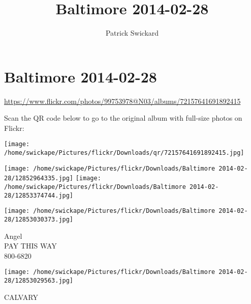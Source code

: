 \documentclass[10pt,letterpaper]{article}
\title{Baltimore 2014-02-28}
\author{Patrick Swickard}
\date{}
\begin{document}
\section*{Baltimore 2014-02-28}

\url{https://www.flickr.com/photos/99753978@N03/albums/72157641691892415}

Scan the QR code below to go to the original album with full-size photos on Flickr:

\texttt{[image: /home/swickape/Pictures/flickr/Downloads/qr/72157641691892415.jpg]}
\pagebreak

\texttt{[image: /home/swickape/Pictures/flickr/Downloads/Baltimore 2014-02-28/12852964335.jpg]}
\texttt{[image: /home/swickape/Pictures/flickr/Downloads/Baltimore 2014-02-28/12853374744.jpg]}

\vspace{0.25in}
\texttt{[image: /home/swickape/Pictures/flickr/Downloads/Baltimore 2014-02-28/12853030373.jpg]}

Angel\\
PAY THIS WAY\\
800{-}6820
\pagebreak

\texttt{[image: /home/swickape/Pictures/flickr/Downloads/Baltimore 2014-02-28/12853029563.jpg]}

CALVARY
\pagebreak
\end{document}
